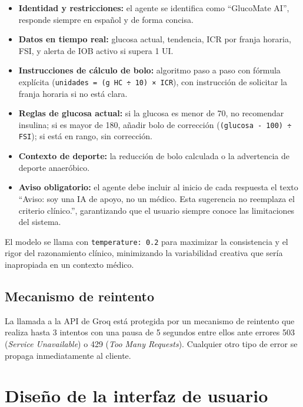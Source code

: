 \begin{itemize}
    \item \textbf{Identidad y restricciones:} el agente se identifica como
          ``GlucoMate AI'', responde siempre en español y de forma concisa.
    \item \textbf{Datos en tiempo real:} glucosa actual, tendencia, ICR por franja
          horaria, FSI, y alerta de IOB activo si supera 1 UI.
    \item \textbf{Instrucciones de cálculo de bolo:} algoritmo paso a paso con
          fórmula explícita (\texttt{unidades = (g HC ÷ 10) × ICR}), con instrucción
          de solicitar la franja horaria si no está clara.
    \item \textbf{Reglas de glucosa actual:} si la glucosa es menor de 70, no
          recomendar insulina; si es mayor de 180, añadir bolo de corrección
          (\texttt{(glucosa - 100) ÷ FSI}); si está en rango, sin corrección.
    \item \textbf{Contexto de deporte:} la reducción de bolo calculada o la
          advertencia de deporte anaeróbico.
    \item \textbf{Aviso obligatorio:} el agente debe incluir al inicio de cada
          respuesta el texto ``Aviso: soy una IA de apoyo, no un médico. Esta sugerencia
          no reemplaza el criterio clínico.'', garantizando que el usuario siempre
          conoce las limitaciones del sistema.
\end{itemize}

El modelo se llama con \texttt{temperature: 0.2} para maximizar la consistencia
y el rigor del razonamiento clínico, minimizando la variabilidad creativa que
sería inapropiada en un contexto médico.

\subsection{Mecanismo de reintento}
\label{subsec:reintento-ia}

La llamada a la API de Groq está protegida por un mecanismo de reintento que
realiza hasta 3 intentos con una pausa de 5 segundos entre ellos ante errores 503
(\textit{Service Unavailable}) o 429 (\textit{Too Many Requests}). Cualquier otro
tipo de error se propaga inmediatamente al cliente.

\section{Diseño de la interfaz de usuario}
\label{sec:diseno-ui}


